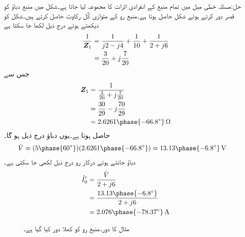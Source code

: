 حل:مسئلہ خطی میل میں تمام منبع کے انفرادی اثرات کا مجموعہ لیا جاتا ہے۔شکل  میں منبع دباؤ کو قصر دور کرتے ہوئے  شکل  حاصل ہوتا ہے۔منبع رو کے متوازی کُل رکاوٹ  حاصل کرتے ہیں۔شکل کو دیکھتے ہوئے درج ذیل لکھا جا سکتا ہے
\begin{align*}
\frac{1}{{{\boldsymbol{Z}}}_1}&=\frac{1}{j2-j4}+\frac{1}{10}+\frac{1}{2+j6}\\
&=\frac{3}{20}+j\frac{7}{20}
\end{align*}
جس سے
\begin{align*}
\bZ_1&=\frac{1}{\frac{3}{20}+j\frac{7}{20}}\\
&=\frac{30}{29}-j\frac{70}{29}\\
&=2.6261\phase{-66.8^{\circ}} \, \si{\ohm}
\end{align*}
حاصل ہوتا ہے۔یوں دباؤ  درج ذیل ہو گا۔
\begin{align*}
\hat{V}&=(5\phase{60^{\circ}})(2.6261\phase{-66.8^{\circ}})=13.13\phase{-6.8^{\circ}}\,\si{\volt} 
\end{align*}
دباؤ جانتے ہوئے درکار رو درج ذیل لکھی جا سکتی ہے۔
\begin{gather}
\begin{aligned}\label{مساوات-بدلتا_منبع_رو_کی_رو}
\hat{I}'_0&=\frac{\hat{V}}{2+j6}\\
&=\frac{13.13\phase{-6.8^{\circ}}}{2+j6}\\
&=2.076\phase{-78.37^{\circ}} \, \si{\ampere}
\end{aligned}
\end{gather}
%
\begin{figure}
\centering
{}
\caption{مثال  کا دور۔منبع رو کو کھلا دور کیا گیا ہے۔}
\label{شکل_بدلتا_تراکیب_ت}
\end{figure}


